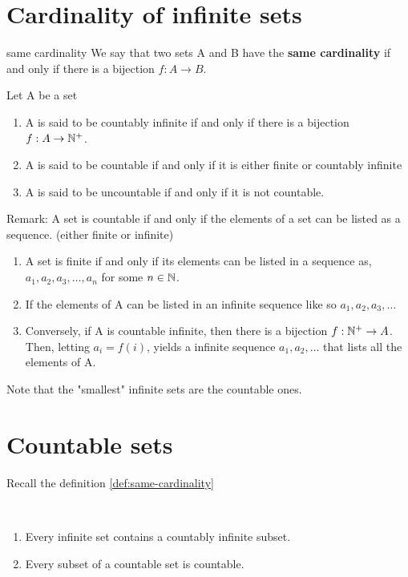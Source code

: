 \documentclass[../MATH-2000-Notes.tex]{subfiles}
\begin{document}
\section{Cardinality of infinite sets}
\begin{Definition}
    {same cardinality} \label{def:same-cardinality}
    We say that two sets A and B have the \textbf{same cardinality} if and only if there is a bijection \(f: A\rightarrow B\).

    Let A be a set
    \begin{enumerate}
        \item A is said to be countably infinite if and only if there is a bijection \(f: A\to \mathbb{N}^+\).
        \item A is said to be countable if and only if it is either finite or countably infinite
        \item A is said to be uncountable if and only if it is not countable.
    \end{enumerate}
\end{Definition}
\begin{Note}
    Remark: A set is countable if and only if the elements of a set can be listed as a sequence. (either finite or infinite)
    \begin{enumerate}
        \item A set is finite if and only if its elements can be listed in a sequence as, \(a_1,a_2,a_3,\dots,a_n\) for some \(n\in \mathbb{N}\).
        \item If the elements of A can be listed in an infinite sequence like so \(a_1,a_2,a_3,\dots\)
        \item Conversely, if A is countable infinite, then there is a bijection \(f: \mathbb{N}^+ \to A\). Then, letting \(a_i  = f(i)\), yields a infinite sequence \(a_1,a_2,\dots\) that lists all the elements of A.
    \end{enumerate}

    Note that the "smallest" infinite sets are the countable ones.
\end{Note}


\section{Countable sets}
Recall the definition \ref{def:same-cardinality}
\begin{Theorem}{}~\\
    \label{CountableSmall}
    \begin{enumerate}
        \item \label{CountableSmall-HasSubset}
              Every infinite set contains a countably infinite subset.
        \item  \label{CountableSmall-subset}
              Every subset of a countable set is countable.
    \end{enumerate}
\end{Theorem}
\end{document}
